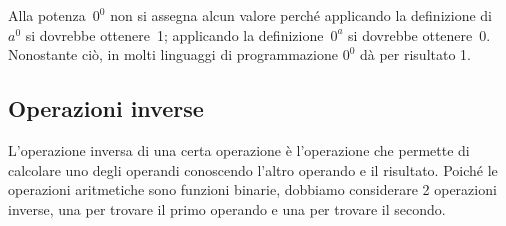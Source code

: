 \begin{osservazione}{}{} 
Alla potenza~\(0^0\) non si assegna alcun valore perché applicando la 
definizione di~\(a^0\) si dovrebbe ottenere~1;
applicando la definizione~\(0^a\) si dovrebbe ottenere~0. Nonostante ciò, 
in molti linguaggi di programmazione \(0^0\) dà per risultato 1.
\end{osservazione}


\subsection{Operazioni inverse}

L'operazione inversa di una certa operazione è 
l'operazione che permette di calcolare uno degli operandi conoscendo 
l'altro operando e il risultato.
Poiché le operazioni aritmetiche sono funzioni binarie, dobbiamo 
considerare 2 operazioni inverse, una per trovare il primo operando e 
una per trovare il secondo.


